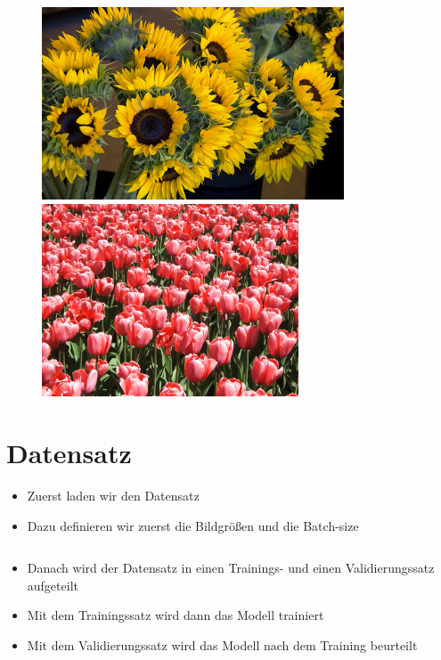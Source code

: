 \documentclass[t]{beamer}
\newcommand\pycode[1]{\inputminted[frame=lines, framesep=2mm, fontsize=\normalsize]{python}{#1}}
\begin{document}
\begin{frame}
\begin{figure}
    \end{figure}
    \begin{figure}
        \centering
        \begin{minipage}{0.4\textwidth}
            \centering
            \includegraphics[width=0.8\textwidth]{./teach-plots/sunflower.jpg} %
        \end{minipage}\hfill
        \begin{minipage}{0.4\textwidth}
            \centering
            \includegraphics[width=0.68\textwidth]{./teach-plots/tulip.jpg} %
        \end{minipage}
    \end{figure}
\end{frame}

\section{Datensatz}
\begin{frame}
    \begin{itemize}
        \item Zuerst laden wir den Datensatz
        \item Dazu definieren wir zuerst die Bildgrößen und die Batch-size
        \pycode{./code-snippets/dataset-params.py}
        \item Danach wird der Datensatz in einen Trainings- und einen Validierungssatz aufgeteilt
        \item Mit dem Trainingssatz wird dann das Modell trainiert
        \item Mit dem Validierungssatz wird das Modell nach dem Training beurteilt
    \end{itemize}
\end{frame}
\end{document}
